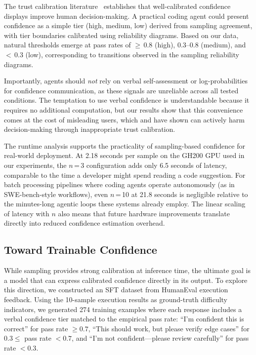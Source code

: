 \documentclass{article}
\begin{document}
The trust calibration literature~\citep{zhang2020effect, yin2019understanding} establishes that well-calibrated confidence displays improve human decision-making. A practical coding agent could present confidence as a simple tier (high, medium, low) derived from sampling agreement, with tier boundaries calibrated using reliability diagrams. Based on our data, natural thresholds emerge at pass rates of $\geq$\,0.8 (high), 0.3--0.8 (medium), and $<$\,0.3 (low), corresponding to transitions observed in the sampling reliability diagrams.

Importantly, agents should \emph{not} rely on verbal self-assessment or log-probabilities for confidence communication, as these signals are unreliable across all tested conditions. The temptation to use verbal confidence is understandable because it requires no additional computation, but our results show that this convenience comes at the cost of misleading users, which \citet{rechkemmer2022confidence} and \citet{bansal2021does} have shown can actively harm decision-making through inappropriate trust calibration.

The runtime analysis supports the practicality of sampling-based confidence for real-world deployment. At 2.18 seconds per sample on the GH200 GPU used in our experiments, the $n$\,=\,3 configuration adds only 6.5 seconds of latency, comparable to the time a developer might spend reading a code suggestion. For batch processing pipelines where coding agents operate autonomously (as in SWE-bench-style workflows), even $n$\,=\,10 at 21.8 seconds is negligible relative to the minutes-long agentic loops these systems already employ. The linear scaling of latency with $n$ also means that future hardware improvements translate directly into reduced confidence estimation overhead.

\subsection{Toward Trainable Confidence}
\label{sec:sft}

While sampling provides strong calibration at inference time, the ultimate goal is a model that can express calibrated confidence directly in its output. To explore this direction, we constructed an SFT dataset from HumanEval execution feedback. Using the 10-sample execution results as ground-truth difficulty indicators, we generated 274 training examples where each response includes a verbal confidence tier matched to the empirical pass rate: ``I'm confident this is correct'' for pass rate $\geq 0.7$, ``This should work, but please verify edge cases'' for $0.3 \leq$ pass rate $< 0.7$, and ``I'm not confident---please review carefully'' for pass rate $< 0.3$.
\end{document}
